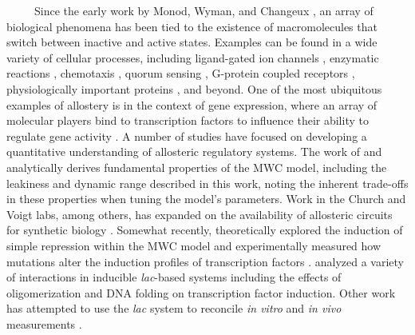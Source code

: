 \documentclass[12pt]{caltech_thesis}
\begin{document}
~~~~~Since the early work by Monod, Wyman, and Changeux
\autocite{monod1963,monod1965}, an array of biological phenomena has
been tied to the existence of macromolecules that switch between
inactive and active states. Examples can be found in a wide variety of
cellular processes, including ligand-gated ion channels
\autocite{auerbach2012}, enzymatic reactions
\autocite{velyvis2007,einav2016}, chemotaxis \autocite{keymer2006},
quorum sensing \autocite{swem2008}, G-protein coupled receptors
\autocite{canals2012}, physiologically important proteins
\autocite{milo2007,levantino2012}, and beyond. One of the most
ubiquitous examples of allostery is in the context of gene expression,
where an array of molecular players bind to transcription factors to
influence their ability to regulate gene activity \autocite{li2014}. A
number of studies have focused on developing a quantitative
understanding of allosteric regulatory systems. The work of
\textcite{martins2011} and \textcite{marzen2013} analytically derives
fundamental properties of the MWC model, including the leakiness and
dynamic range described in this work, noting the inherent trade-offs in
these properties when tuning the model's parameters. Work in the Church
and Voigt labs, among others, has expanded on the availability of
allosteric circuits for synthetic biology
\autocite{lutz1997,moon2012,rogers2015,rohlhill2017}. Somewhat recently,
\textcite{daber2009a} theoretically explored the induction of simple
repression within the MWC model and experimentally measured how
mutations alter the induction profiles of transcription factors
\autocite{daber2011}. \textcite{vilar2013} analyzed a variety of
interactions in inducible \emph{lac}-based systems including the effects
of oligomerization and DNA folding on transcription factor induction.
Other work has attempted to use the \emph{lac} system to reconcile
\emph{in vitro} and \emph{in vivo} measurements \autocite{tungtur2011}.
\end{document}
